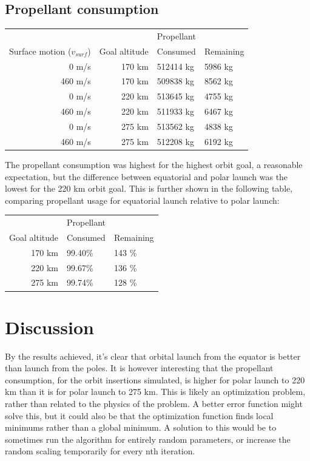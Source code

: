 \documentclass[11pt]{article}
\begin{document}
\subsection{Propellant consumption}
\begin{center}
  \begin{tabular}{ r | r  | l  l  }
     &   &   Propellant   \\
    Surface motion ($v_{surf}$)  &  Goal altitude & Consumed & Remaining \\
    \hline
    0 m/s & 170 km & 512414 kg & 5986 kg \\
    460 m/s & 170 km & 509838 kg & 8562 kg \\
    \hline
    0 m/s & 220 km & 513645 kg & 4755 kg \\
    460 m/s & 220 km  & 511933 kg & 6467 kg \\
    \hline
    0 m/s & 275 km & 513562 kg & 4838 kg \\
    460 m/s & 275 km & 512208 kg & 6192 kg
  \end{tabular}
\end{center}
The propellant consumption was highest for the highest orbit goal, a reasonable expectation, but the difference between equatorial and polar launch was the lowest for the 220 km orbit goal.
This is further shown in the following table, comparing propellant usage for equatorial launch relative to polar launch:
\begin{center}
  \begin{tabular}{ r | l  l  }
     &   Propellant   \\
    Goal altitude & Consumed & Remaining \\
    \hline
    170 km & 99.40\% & 143 \% \\
    220 km & 99.67\% & 136 \% \\
    275 km & 99.74\% & 128 \%
  \end{tabular}
\end{center}



\section{Discussion}

By the results achieved, it's clear that orbital launch from the equator is better than launch from the poles. 
It is however interesting that the propellant consumption, for the orbit insertions simulated, is higher for polar launch to 220 km than it is for polar launch to 275 km.
This is likely an optimization problem, rather than related to the physics of the problem. A better error function might solve this,
but it could also be that the optimization function finds local minimums rather than a global minimum. 
A solution to this would be to sometimes run the algorithm for entirely random parameters, or increase the random scaling temporarily for every nth iteration. 
\end{document}
